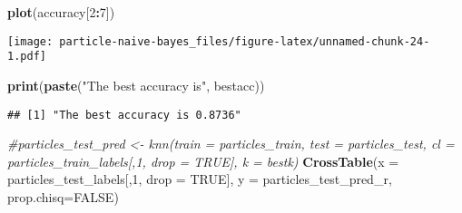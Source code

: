 \documentclass[
]{article}
\newenvironment{Shaded}{\begin{snugshade}}{\end{snugshade}}
\newcommand{\CommentTok}[1]{\textcolor[rgb]{0.56,0.35,0.01}{\textit{#1}}}
\newcommand{\DataTypeTok}[1]{\textcolor[rgb]{0.13,0.29,0.53}{#1}}
\newcommand{\DecValTok}[1]{\textcolor[rgb]{0.00,0.00,0.81}{#1}}
\newcommand{\KeywordTok}[1]{\textcolor[rgb]{0.13,0.29,0.53}{\textbf{#1}}}
\newcommand{\NormalTok}[1]{#1}
\newcommand{\OperatorTok}[1]{\textcolor[rgb]{0.81,0.36,0.00}{\textbf{#1}}}
\newcommand{\OtherTok}[1]{\textcolor[rgb]{0.56,0.35,0.01}{#1}}
\newcommand{\StringTok}[1]{\textcolor[rgb]{0.31,0.60,0.02}{#1}}
\begin{document}
\begin{Shaded}
\begin{Highlighting}[]
\KeywordTok{plot}\NormalTok{(accuracy[}\DecValTok{2}\OperatorTok{:}\DecValTok{7}\NormalTok{])}
\end{Highlighting}
\end{Shaded}

\texttt{[image: particle-naive-bayes\_files/figure-latex/unnamed-chunk-24-1.pdf]}

\begin{Shaded}
\begin{Highlighting}[]
\KeywordTok{print}\NormalTok{(}\KeywordTok{paste}\NormalTok{(}\StringTok{"The best accuracy is"}\NormalTok{, bestacc))}
\end{Highlighting}
\end{Shaded}

\begin{verbatim}
## [1] "The best accuracy is 0.8736"
\end{verbatim}

\begin{Shaded}
\begin{Highlighting}[]
\CommentTok{#particles_test_pred <- knn(train = particles_train, test = particles_test, cl = particles_train_labels[,1, drop = TRUE], k = bestk)}
\KeywordTok{CrossTable}\NormalTok{(}\DataTypeTok{x =}\NormalTok{ particles_test_labels[,}\DecValTok{1}\NormalTok{, }\DataTypeTok{drop =} \OtherTok{TRUE}\NormalTok{], }\DataTypeTok{y =}\NormalTok{ particles_test_pred_r, }\DataTypeTok{prop.chisq=}\OtherTok{FALSE}\NormalTok{)}
\end{Highlighting}
\end{Shaded}
\end{document}
